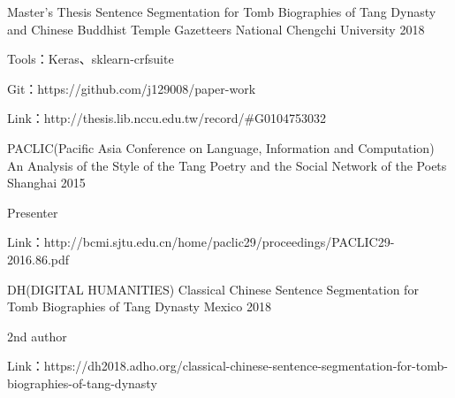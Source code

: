 

\begin{cventries}
  \cventry
    {Master's Thesis} %
    {Sentence Segmentation for Tomb Biographies of Tang Dynasty and Chinese Buddhist Temple Gazetteers} %
    {National Chengchi University} %
    {2018} %
    {
      \begin{cvitems} %
        \item {Tools：Keras、sklearn-crfsuite}
        \item {Git：https://github.com/j129008/paper-work}
        \item {Link：http://thesis.lib.nccu.edu.tw/record/\#G0104753032}
      \end{cvitems}
    }


  \cventry
    {PACLIC(Pacific Asia Conference on Language, Information and Computation)} %
    {An Analysis of the Style of the Tang Poetry and the Social Network of the Poets}
    {Shanghai} %
    {2015} %
    {
      \begin{cvitems} %
        \item {Presenter} %
        \item {Link：http://bcmi.sjtu.edu.cn/home/paclic29/proceedings/PACLIC29-2016.86.pdf}
      \end{cvitems}
    }


  \cventry
    {DH(DIGITAL HUMANITIES)} %
    {Classical Chinese Sentence Segmentation for Tomb Biographies of Tang Dynasty} %
    {Mexico} %
    {2018} %
    {
      \begin{cvitems} %
      \item {2nd author} %
      \item {Link：https://dh2018.adho.org/classical-chinese-sentence-segmentation-for-tomb-biographies-of-tang-dynasty}
      \end{cvitems}
    }

\end{cventries}
